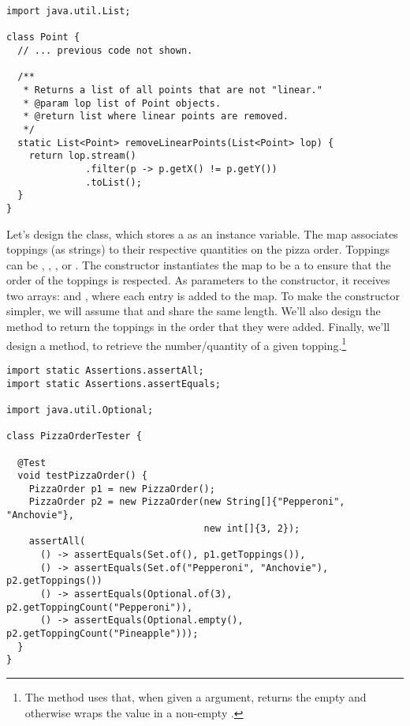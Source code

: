 \enlargethispage{-1\baselineskip}
\begin{lstlisting}[language=MyJava]
import java.util.List;

class Point {
  // ... previous code not shown. 

  /**
   * Returns a list of all points that are not "linear."
   * @param lop list of Point objects.
   * @return list where linear points are removed.
   */
  static List<Point> removeLinearPoints(List<Point> lop) {
    return lop.stream()
              .filter(p -> p.getX() != p.getY())
              .toList();
  }
}
\end{lstlisting}

Let's design the  class, which stores a  as an instance variable.
The map associates toppings (as strings) to their respective quantities on the pizza order. 
Toppings can be , , , or .
The  constructor instantiates the map to be a  to ensure that the order of the toppings is respected.
As parameters to the constructor, it receives two arrays:  and , where each entry is added to the map.
To make the constructor simpler, we will assume that  and  share the same length.
We'll also design the  method to return the toppings in the order that they were added.
Finally, we'll design a method,  to retrieve the number/quantity of a given topping.\footnote{The  method uses  that, when given a  argument, returns the empty  and otherwise wraps the value in a non-empty .}

\begin{lstlisting}[language=MyJava]
import static Assertions.assertAll;
import static Assertions.assertEquals;

import java.util.Optional;

class PizzaOrderTester {

  @Test
  void testPizzaOrder() {
    PizzaOrder p1 = new PizzaOrder();
    PizzaOrder p2 = new PizzaOrder(new String[]{"Pepperoni", "Anchovie"},
                                   new int[]{3, 2});
    assertAll(
      () -> assertEquals(Set.of(), p1.getToppings()),
      () -> assertEquals(Set.of("Pepperoni", "Anchovie"), p2.getToppings())
      () -> assertEquals(Optional.of(3), p2.getToppingCount("Pepperoni")),
      () -> assertEquals(Optional.empty(), p2.getToppingCount("Pineapple")));
  }
}
\end{lstlisting}

